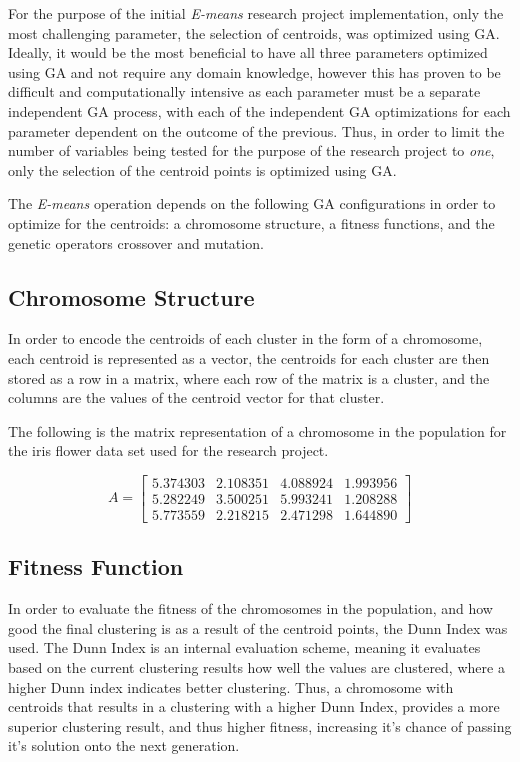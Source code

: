 \documentclass{article}
\begin{document}
For the purpose of the initial \emph{E-means} research project implementation, only the most challenging parameter, the selection of centroids, was optimized using GA. Ideally, it would be the most beneficial to have all three parameters optimized using GA and not require any domain knowledge, however this has proven to be difficult and computationally intensive as each parameter must be a separate independent GA process, with each of the independent GA optimizations for each parameter dependent on the outcome of the previous. Thus, in order to limit the number of variables being tested for the purpose of the research project to \emph{one}, only the selection of the centroid points is optimized using GA.

The \emph{E-means} operation depends on the following GA configurations in order to optimize for the centroids: a chromosome structure, a fitness functions, and the genetic operators crossover and mutation.


\subsection{Chromosome Structure}

In order to encode the centroids of each cluster in the form of a chromosome, each centroid is represented as a vector, the centroids for each cluster are then stored as a row in a matrix, where each row of the matrix is a cluster, and the columns are the values of the centroid vector for that cluster.

The following is the matrix representation of a chromosome in the population for the iris flower data set\cite{bezdek1999will} used for the research project.

\begin{equation}
A = \begin{bmatrix}
    5.374303   & 2.108351   & 4.088924   & 1.993956 \\
    5.282249   & 3.500251   & 5.993241   & 1.208288 \\
    5.773559   & 2.218215   & 2.471298   & 1.644890 
\end{bmatrix}
\label{eq:chromosome}
\end{equation}


\subsection{Fitness Function}

In order to evaluate the fitness of the chromosomes in the population, and how good the final clustering is as a result of the centroid points, the Dunn Index was used. The Dunn Index is an internal evaluation scheme, meaning it evaluates based on the current clustering results how well the values are clustered, where a higher Dunn index indicates better clustering\cite{dunn1973fuzzy}. Thus, a chromosome with centroids that results in a clustering with a higher Dunn Index, provides a more superior clustering result, and thus higher fitness, increasing it's chance of passing it's solution onto the next generation.
\end{document}

